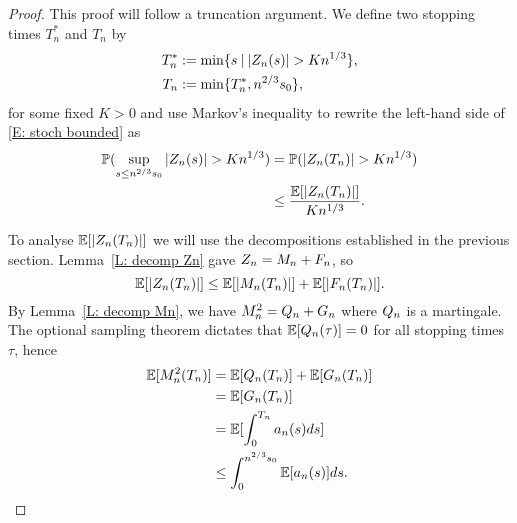 \begin{proof}
	This proof will follow a truncation argument.
	We define two stopping times $T^*_n$ and $T_n$ by
	\begin{align} 
	T^*_n &:= \min \lbrace s \: | \: |Z_n(s)| > K n^{1 / 3} \rbrace, \label{E: def T*n} \\
	T_n &:= \min \lbrace T^*_n, n^{2 / 3}s_0 \rbrace ,  \label{E: def Tn}
	\end{align}
	for some fixed $K>0$ and use Markov's inequality to rewrite the left-hand side of \eqref{E: stoch bounded} as
	\begin{equation} \label{E: stoch bounded 2}
	\begin{aligned}
	\mathbb{P}( \sup_{s\leq n^{2/3} s_0} |Z_n(s)| > K n^{1 / 3} ) &= \mathbb{P}( |Z_n(T_n)| > Kn^{1 / 3} ) \\
	&\leq \frac{\mathbb{E}[|Z_n(T_n)|]}{Kn^{1 / 3}}.
	\end{aligned} 
	\end{equation}
	
	To analyse $\mathbb{E}[|Z_n(T_n)|]$ we will use the decompositions established in the previous section. 
	Lemma~\ref{L: decomp Zn} gave $Z_n = M_n + F_n$,
	so \begin{equation} \label{E: Exp(|Zn|)}
	\mathbb{E}[|Z_n(T_n)|] \leq \mathbb{E}[|M_n(T_n)|] + \mathbb{E}[|F_n(T_n)|].
	\end{equation}
	By Lemma~\ref{L: decomp Mn}, we have $M^2_n = Q_n + G_n$ where $Q_n$ is a martingale. 
	The optional sampling theorem dictates that 
	$\mathbb{E}[Q_n(\tau)] = 0$ 
	for all stopping times $\tau$, hence 
	\begin{align*}
	\mathbb{E}[M^2_n(T_n)] 
	&= \mathbb{E}[Q_n(T_n)] + \mathbb{E}[G_n(T_n)] \\
	&= \mathbb{E}[G_n(T_n)] \\
	&= \mathbb{E}[ \int_{0}^{T_n} a_n(s)ds ] \\
	&\leq \int_{0}^{n^{2 / 3}s_0} \mathbb{E}[a_n(s)] ds.
	\end{align*}
	

\end{proof}

